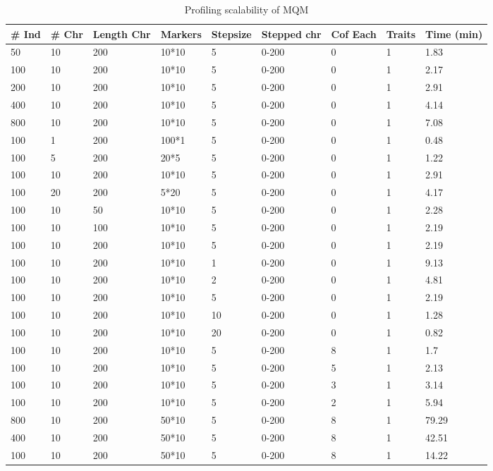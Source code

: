\begin{table}[h!t]
	\caption{Profiling scalability of MQM}
	\centering
	\begin{tabular}{| l | l | l | l | l | l | l | l | l |}
	\hline
	\# Ind & \# Chr  & Length Chr & Markers & Stepsize & Stepped chr & Cof Each & Traits & Time (min)\\
	\hline
	\hline
	50 & 10 & 200 & 10*10 & 5 & 0-200 & 0 & 1 & 1.83\\
	100 & 10 & 200 & 10*10 & 5 & 0-200 & 0 & 1 & 2.17\\
	200 & 10 & 200 & 10*10 & 5 & 0-200 & 0 & 1 & 2.91\\
	400 & 10 & 200 & 10*10 & 5 & 0-200 & 0 & 1 & 4.14\\
	800 & 10 & 200 & 10*10 & 5 & 0-200 & 0 & 1 & 7.08\\	
	\hline
	100 & 1 & 200 & 100*1 & 5 & 0-200 & 0 & 1 & 0.48\\
	100 & 5 & 200 & 20*5 & 5 & 0-200 & 0 & 1 & 1.22\\
	100 & 10 & 200 & 10*10 & 5 & 0-200 & 0 & 1 & 2.91\\
	100 & 20 & 200 & 5*20 & 5 & 0-200 & 0 & 1 & 4.17\\
	\hline
	100 & 10 & 50 & 10*10 & 5 & 0-200 & 0 & 1 & 2.28\\
	100 & 10 & 100 & 10*10 & 5 & 0-200 & 0 & 1 & 2.19\\
	100 & 10 & 200 & 10*10 & 5 & 0-200 & 0 & 1 & 2.19\\
	\hline
	100 & 10 & 200 & 10*10 & 1 & 0-200 & 0 & 1 & 9.13\\
	100 & 10 & 200 & 10*10 & 2 & 0-200 & 0 & 1 & 4.81\\
	100 & 10 & 200 & 10*10 & 5 & 0-200 & 0 & 1 & 2.19\\
	100 & 10 & 200 & 10*10 & 10 & 0-200 & 0 & 1 & 1.28\\
	100 & 10 & 200 & 10*10 & 20 & 0-200 & 0 & 1 & 0.82\\
	\hline
	100 & 10 & 200 & 10*10 & 5 & 0-200 & 8 & 1 & 1.7\\
	100 & 10 & 200 & 10*10 & 5 & 0-200 & 5 & 1 & 2.13\\
	100 & 10 & 200 & 10*10 & 5 & 0-200 & 3 & 1 & 3.14\\
	100 & 10 & 200 & 10*10 & 5 & 0-200 & 2 & 1 & 5.94\\
	\hline
	800 & 10 & 200 & 50*10 & 5 & 0-200 & 8 & 1 & 79.29\\
	400 & 10 & 200 & 50*10 & 5 & 0-200 & 8 & 1 & 42.51\\
	100 & 10 & 200 & 50*10 & 5 & 0-200 & 8 & 1 & 14.22\\
	\hline
	\end{tabular}
	\label{tbl:tabel4}
\end{table}

